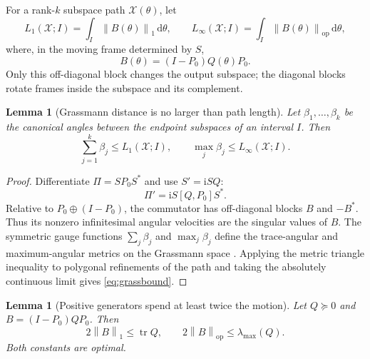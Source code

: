 \documentclass[11pt]{article}
\newtheorem{lemma}[theorem]{Lemma}
\theoremstyle{definition}
\theoremstyle{remark}
\newcommand{\tr}{\operatorname{tr}}
\newcommand{\dd}{\mathrm{d}}
\newcommand{\snorm}[1]{\left\lVert#1\right\rVert_1}
\newcommand{\onorm}[1]{\left\lVert#1\right\rVert_{\mathrm{op}}}
\begin{document}
For a rank-$k$ subspace path $\mathcal X(\theta)$, let
\begin{equation}\label{eq:grasslength}
 L_1(\mathcal X;I)=\int_I\snorm{B(\theta)}\,\dd\theta,
 \qquad
 L_\infty(\mathcal X;I)=\int_I\onorm{B(\theta)}\,\dd\theta,
\end{equation}
where, in the moving frame determined by $S$,
\begin{equation}\label{eq:Bblock}
 B(\theta)=(I-P_0)Q(\theta)P_0.
\end{equation}
Only this off-diagonal block changes the output subspace; the diagonal
blocks rotate frames inside the subspace and its complement.

\begin{lemma}[Grassmann distance is no larger than path length]
\label{lem:grassmann}
Let $\beta_1,\ldots,\beta_k$ be the canonical angles between the endpoint
subspaces of an interval $I$.  Then
\begin{equation}\label{eq:grassbound}
 \sum_{j=1}^k\beta_j\leq L_1(\mathcal X;I),
 \qquad
 \max_j\beta_j\leq L_\infty(\mathcal X;I).
\end{equation}
\end{lemma}

\begin{proof}
Differentiate $\Pi=S P_0S^*$ and use $S'=\mathrm{i}SQ$:
\[
 \Pi'=\mathrm{i}S[Q,P_0]S^*.
\]
Relative to $P_0\oplus(I-P_0)$, the commutator has off-diagonal blocks
$B$ and $-B^*$.  Thus its nonzero infinitesimal angular velocities are the
singular values of $B$.  The symmetric gauge functions
$\sum_j\beta_j$ and $\max_j\beta_j$ define the trace-angular and
maximum-angular metrics on the Grassmann space
\cite{QiuZhangLi2005,EdelmanAriasSmith1998}.  Applying the metric triangle
inequality to polygonal refinements of the path and taking the absolutely
continuous limit gives \eqref{eq:grassbound}.
\end{proof}

\begin{lemma}[Positive generators spend at least twice the motion]
\label{lem:positiveblock}
Let $Q\succeq0$ and $B=(I-P_0)QP_0$.  Then
\begin{equation}\label{eq:blockbounds}
 2\snorm{B}\leq\tr Q,
 \qquad
 2\onorm{B}\leq\lambda_{\max}(Q).
\end{equation}
Both constants are optimal.
\end{lemma}
\end{document}
